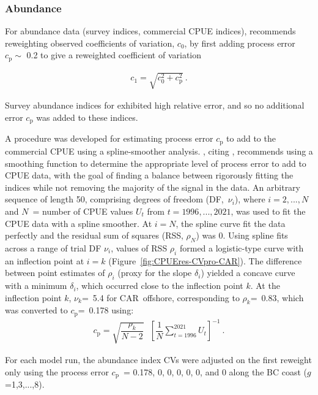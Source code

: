 \documentclass[11pt]{book}
\def\vsd{\vspace*{1ex}}     %
\renewcommand{\eb}{\vsd \vsd \begin{eqnarray}}
\renewcommand{\ee}{\end{eqnarray} \vsd }
\begin{document}
\subsubsection{Abundance} \label{sss:rwt_abund}


For abundance data (survey indices, commercial CPUE indices), \citet{Francis:2011} recommends reweighting observed coefficients of variation, $c_0$, by first adding process error $c_\text{p} \sim$ 0.2 to give a reweighted coefficient of variation

\eb
c_1 = \sqrt{c_0^2 + c_\text{p}^2}~. \label{reweight}
\ee

Survey abundance indices for \spc{} exhibited high relative error, and so no additional error $c_\text{p}$ was added to these indices.

A procedure was developed for estimating process error $c_\text{p}$ to add to the commercial CPUE using a spline-smoother analysis.
\citet{Francis:2011}, citing \citet{Clark-Hare:2006}, recommends using a smoothing function to determine the appropriate level of process error to add to CPUE data, with the goal of finding a balance between rigorously fitting the indices while not removing the majority of the signal in the data.
An arbitrary sequence of length 50, comprising degrees of freedom (DF,~$\nu_i$), where $i=2,...,N$ and $N$~= number of CPUE values $U_t$ from $t=1996,...,2021$, was used to fit the CPUE data with a spline smoother.
At $i=N$, the spline curve fit the data perfectly and the residual sum of squares (RSS, $\rho_N$) was 0.
Using spline fits across a range of trial DF $\nu_i$, values of RSS $\rho_i$ formed a logistic-type curve with an inflection point at $i=k$ (Figure~\ref{fig:CPUEres-CVpro-CAR}).
The difference between point estimates of $\rho_i$ (proxy for the slope $\delta_i$) yielded a concave curve with a minimum $\delta_i$, which occurred close to the inflection point $k$.
At the inflection point $k$, $\nu_k$=~5.4 for CAR~offshore, corresponding to $\rho_k$=~0.83, which was converted to $c_\text{p}$=~0.178 using:
\vspace{-0.25\baselineskip}%
\eb
c_\text{p} = \sqrt{\dfrac{\rho_k}{N-2}}~~~{\left[ \dfrac{1}{N} \sum\limits_{t=1996}^{2021} U_t \right]}^{-1}~. \label{cvpro.cpue}
\ee

For each model run, the abundance index CVs were adjusted on the first reweight only using the process error $c_\text{p}$~= 0.178, 0, 0, 0, 0, 0, and 0 along the BC coast ($g$=1,3,...,8).
\end{document}
